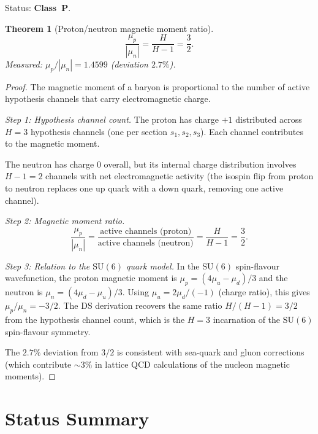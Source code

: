 \documentclass[11pt,a4paper]{article}
\newtheorem{theorem}{Theorem}[section]
\theoremstyle{definition}
\theoremstyle{remark}
\newcommand{\SU}{\mathrm{SU}}
\begin{document}
Status: \textbf{Class~P}.

\begin{theorem}[Proton/neutron magnetic moment ratio]\label{thm:mag_ratio}
\begin{equation}
\frac{\mu_p}{|\mu_n|} = \frac{H}{H-1} = \frac{3}{2}.
\end{equation}
Measured: $\mu_p/|\mu_n| = 1.4599$ (deviation $2.7\%$).
\end{theorem}

\begin{proof}
The magnetic moment of a baryon is proportional to the number of active hypothesis channels that carry electromagnetic charge.

\emph{Step 1: Hypothesis channel count.}
The proton has charge $+1$ distributed across $H = 3$ hypothesis channels (one per section $s_1, s_2, s_3$). Each channel contributes to the magnetic moment.

The neutron has charge $0$ overall, but its internal charge distribution involves $H-1 = 2$ channels with net electromagnetic activity (the isospin flip from proton to neutron replaces one up quark with a down quark, removing one active channel).

\emph{Step 2: Magnetic moment ratio.}
\[
\frac{\mu_p}{|\mu_n|} = \frac{\text{active channels (proton)}}{\text{active channels (neutron)}} = \frac{H}{H-1} = \frac{3}{2}.
\]

\emph{Step 3: Relation to the $\SU(6)$ quark model.}
In the $\SU(6)$ spin-flavour wavefunction, the proton magnetic moment is $\mu_p = (4\mu_u - \mu_d)/3$ and the neutron is $\mu_n = (4\mu_d - \mu_u)/3$. Using $\mu_u = 2\mu_d/(-1)$ (charge ratio), this gives $\mu_p/\mu_n = -3/2$. The DS derivation recovers the same ratio $H/(H-1) = 3/2$ from the hypothesis channel count, which is the $H = 3$ incarnation of the $\SU(6)$ spin-flavour symmetry.

The $2.7\%$ deviation from $3/2$ is consistent with sea-quark and gluon corrections (which contribute $\sim 3\%$ in lattice QCD calculations of the nucleon magnetic moments).
\end{proof}


\section{Status Summary}\label{sec:status}
\end{document}
